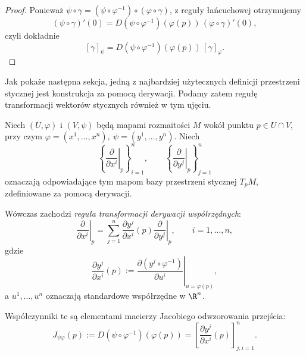 \begin{proof}
Ponieważ $\psi\circ\gamma = (\psi\circ\varphi^{-1})\circ(\varphi\circ\gamma)$,
z reguły łańcuchowej otrzymujemy
\[
(\psi\circ\gamma)'(0)
=
D(\psi\circ\varphi^{-1})(\varphi(p))
\,(\varphi\circ\gamma)'(0),
\]
czyli dokładnie
\[
[\gamma]_{\psi}
=
D(\psi\circ\varphi^{-1})(\varphi(p))\,[\gamma]_{\varphi}.
\]
\end{proof}
Jak pokaże następna sekcja, jedną z najbardziej użytecznych definicji
przestrzeni stycznej jest konstrukcja za pomocą derywacji.
Podamy zatem regułę transformacji wektorów stycznych również
w tym ujęciu.

\begin{fakt}
\label{fakt:transformacja-derywacji}
Niech $(U,\varphi)$ i $(V,\psi)$ będą mapami rozmaitości
$M$ wokół punktu $p\in U\cap V$, przy czym $\varphi=(x^1,\ldots,x^n), \ \psi=(y^1,\ldots,y^n)$.
Niech
\[
\left\{
\left.\frac{\partial}{\partial x^i}\right|_p
\right\}_{i=1}^n,
\qquad
\left\{
\left.\frac{\partial}{\partial y^j}\right|_p
\right\}_{j=1}^n
\]
oznaczają odpowiadające tym mapom bazy przestrzeni
stycznej $T_pM$, zdefiniowane za pomocą derywacji.

Wówczas zachodzi \emph{reguła transformacji derywacji
współrzędnych}:
\begin{equation}
\label{eq:transformacja-derywacji}
\boxed{
\left.\frac{\partial}{\partial x^i}\right|_p
=
\sum_{j=1}^n
\frac{\partial y^j}{\partial x^i}(p)
\left.\frac{\partial}{\partial y^j}\right|_p,
\qquad i=1,\ldots,n,
}
\end{equation}
gdzie
\[
\frac{\partial y^j}{\partial x^i}(p)
:=
\left.
\frac{\partial(y^j\circ\varphi^{-1})}{\partial u^i}
\right|_{u=\varphi(p)},
\]
a $u^1,\ldots,u^n$ oznaczają standardowe współrzędne
w $\R^n$.

Współczynniki te są elementami macierzy Jacobiego
odwzorowania przejścia:
\[
\boxed{
J_{\psi\varphi}(p)
:=
D(\psi\circ\varphi^{-1})(\varphi(p))
=
\left[
\frac{\partial y^j}{\partial x^i}(p)
\right]_{j,i=1}^n.
}
\]
\end{fakt}

